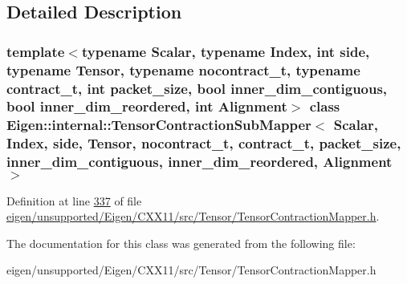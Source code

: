 \subsection{Detailed Description}
\subsubsection*{template$<$typename Scalar, typename Index, int side, typename Tensor, typename nocontract\+\_\+t, typename contract\+\_\+t, int packet\+\_\+size, bool inner\+\_\+dim\+\_\+contiguous, bool inner\+\_\+dim\+\_\+reordered, int Alignment$>$\newline
class Eigen\+::internal\+::\+Tensor\+Contraction\+Sub\+Mapper$<$ Scalar, Index, side, Tensor, nocontract\+\_\+t, contract\+\_\+t, packet\+\_\+size, inner\+\_\+dim\+\_\+contiguous, inner\+\_\+dim\+\_\+reordered, Alignment $>$}



Definition at line \hyperlink{eigen_2unsupported_2_eigen_2_c_x_x11_2src_2_tensor_2_tensor_contraction_mapper_8h_source_l00337}{337} of file \hyperlink{eigen_2unsupported_2_eigen_2_c_x_x11_2src_2_tensor_2_tensor_contraction_mapper_8h_source}{eigen/unsupported/\+Eigen/\+C\+X\+X11/src/\+Tensor/\+Tensor\+Contraction\+Mapper.\+h}.



The documentation for this class was generated from the following file\+:\begin{DoxyCompactItemize}
\item 
eigen/unsupported/\+Eigen/\+C\+X\+X11/src/\+Tensor/\+Tensor\+Contraction\+Mapper.\+h\end{DoxyCompactItemize}
